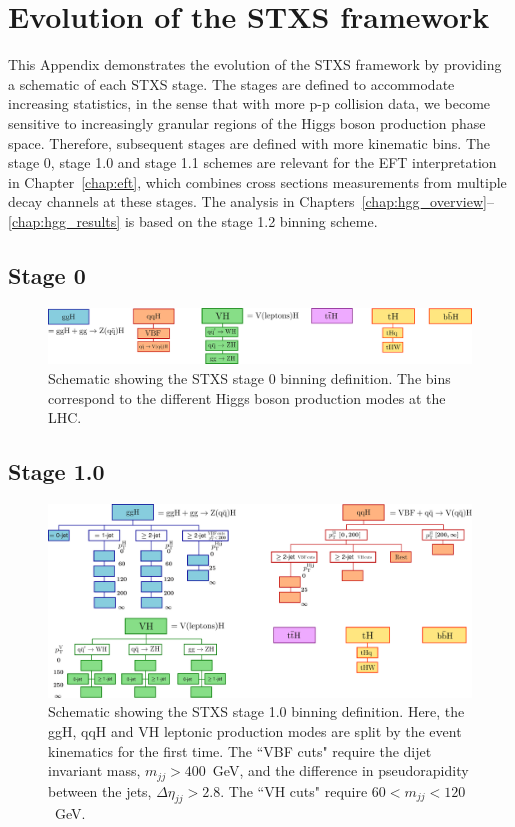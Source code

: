 \chapter{Evolution of the STXS framework}\label{app:merging_schemes}
This Appendix demonstrates the evolution of the STXS framework by providing a schematic of each STXS stage. The stages are defined to accommodate increasing statistics, in the sense that with more p-p collision data, we become sensitive to increasingly granular regions of the Higgs boson production phase space. Therefore, subsequent stages are defined with more kinematic bins. The stage 0, stage 1.0 and stage 1.1 schemes are relevant for the EFT interpretation in Chapter~\ref{chap:eft}, which combines cross sections measurements from multiple decay channels at these stages. The \Hgg analysis in Chapters~\ref{chap:hgg_overview}--\ref{chap:hgg_results} is based on the stage 1.2 binning scheme. 
\section{Stage 0}
\begin{figure}[htb!]
  \centering
  \includegraphics[width=.9\linewidth]{Figures/app_merging_schemes/stage0.pdf}
  \caption[Schematic of the STXS stage 0 binning scheme]
  {
    Schematic showing the STXS stage 0 binning definition. The bins correspond to the different Higgs boson production modes at the LHC.
  }
  \label{fig:stxs_schematic_stage0}
\end{figure}
\newpage
\FloatBarrier
\section{Stage 1.0}
\begin{figure}[htb!]
  \centering
  \includegraphics[width=.9\linewidth]{Figures/app_merging_schemes/stage1p0.pdf}
  \caption[Schematic of the STXS stage 1.0 binning scheme]
  {
    Schematic showing the STXS stage 1.0 binning definition. Here, the ggH, qqH and VH leptonic production modes are split by the event kinematics for the first time. The ``VBF cuts" require the dijet invariant mass, $m_{jj}>400$~GeV, and the difference in pseudorapidity between the jets, $\Delta\eta_{jj}>2.8$. The ``VH cuts" require $60<m_{jj}<120$~GeV.
  }
  \label{fig:stxs_schematic_stage1p0}
\end{figure}
\FloatBarrier
